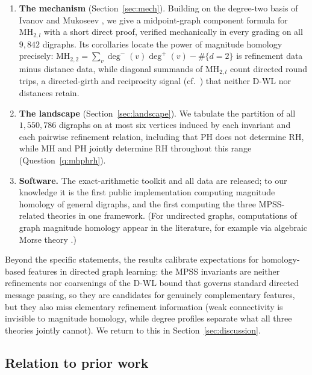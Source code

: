 \documentclass[pdflatex,sn-mathphys,Numbered]{sn-jnl}
\theoremstyle{thmstyleone}
\theoremstyle{thmstyletwo}
\newcommand{\MH}{\mathrm{MH}}
\newcommand{\PH}{\mathrm{PH}}
\newcommand{\RH}{\mathrm{RH}}
\newcommand{\dwlp}{\mathrm{DWL}^{+}}
\begin{document}
\begin{enumerate}
reciprocity-aware $\dwlp$ together with distances subsumes the homology
package in that range; but at six vertices, minimally, magnitude
homology and path homology separate even
$(\dwlp,\text{distance})$-equivalent pairs
(Theorem~\ref{thm:beyonddwlp}): what they detect is asymmetric
round-trip structure modulo geodesic fillability
(Remark~\ref{rem:roundtripdepth}), which arc-typing by reciprocation
cannot see.
\item \textbf{The mechanism} (Section~\ref{sec:mech}). Building on the
degree-two basis of Ivanov and Mukoseev \cite{IvanovMukoseev24}, we give
a midpoint-graph component formula for $\MH_{2,l}$ with a short direct
proof, verified mechanically in every grading on all $9{,}842$ digraphs.
Its corollaries locate the power of magnitude homology precisely:
$\MH_{2,2} = \sum_v \deg^-(v)\deg^+(v) - \#\{d = 2\}$ is refinement data
minus distance data, while diagonal summands of $\MH_{2,l}$ count
directed round trips, a directed-girth and reciprocity signal
(cf.~\cite{AHK24}) that neither D-WL nor distances retain.
\item \textbf{The landscape} (Section~\ref{sec:landscape}). We tabulate
the partition of all $1{,}550{,}786$ digraphs on at most six vertices
induced by each invariant and each pairwise refinement relation,
including that $\PH$ does not determine $\RH$, while $\MH$ and $\PH$
jointly determine $\RH$ throughout this range
(Question~\ref{q:mhphrh}).
\item \textbf{Software.} The exact-arithmetic toolkit and all data are
released; to our knowledge it is the first public implementation
computing magnitude homology of general digraphs, and the first computing
the three MPSS-related theories in one framework. (For undirected graphs,
computations of graph magnitude homology appear in the literature, for
example via algebraic Morse theory \cite{Gu18}.)
\end{enumerate}

Beyond the specific statements, the results calibrate expectations for
homology-based features in directed graph learning: the MPSS invariants
are neither refinements nor coarsenings of the D-WL bound that governs
standard directed message passing, so they are candidates for genuinely
complementary features, but they also miss elementary refinement
information (weak connectivity is invisible to magnitude homology, while
degree profiles separate what all three theories jointly cannot). We
return to this in Section~\ref{sec:discussion}.

\subsection*{Relation to prior work}
\end{document}
